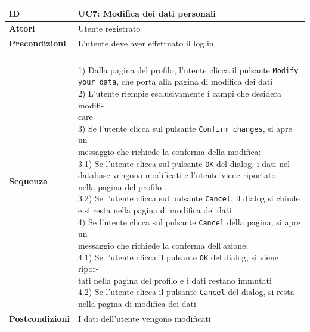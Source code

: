 \documentclass[12pt,a4paper]{article}
\begin{document}
	\begin{tabular}{|l|l|}
		\hline
		\textbf{ID} & UC7: Modifica dei dati personali\\
		\hline
		\textbf{Attori} & Utente registrato\\
		\hline
		\textbf{Precondizioni} & \makecell[l]{L'utente deve aver effettuato il log in\vspace{5px}\\}\\
		\hline
		\textbf{Sequenza} & \makecell[l]{\\1) Dalla pagina del profilo, l'utente clicca il pulsante \texttt{Modify} \\ \texttt{your data}, che porta alla pagina di modifica dei dati\vspace{5px}\\
			2) L'utente riempie esclusivamente i campi che desidera modifi-\\care\vspace{5px}\\
			3) Se l'utente clicca sul pulsante \texttt{Confirm changes}, si apre un \\messaggio che richiede la conferma della modifica:\vspace{5px}\\
			\hspace{11px} 3.1) Se l'utente clicca sul pulsante \texttt{OK} del dialog, i dati nel\\ 
			\hspace{38px}database vengono modificati e l'utente viene riportato \\
			\hspace{38px}nella pagina del profilo\vspace{5px}\\
			\hspace{11px} 3.2) Se l'utente clicca sul pulsante \texttt{Cancel}, il dialog si chiude\\
			\hspace{38px}e si resta nella pagina di modifica dei dati\vspace{5px}\\
			4) Se l'utente clicca sul pulsante \texttt{Cancel} della pagina, si apre un\\
			messaggio che richiede la conferma dell'azione:\vspace{5px}\\
			\hspace{11px} 4.1) Se l'utente clicca il pulsante \texttt{OK} del dialog, si viene ripor-\\
			\hspace{38px}tati nella pagina del profilo e i dati restano immutati\vspace{5px}\\
			\hspace{11px} 4.2) Se l'utente clicca il pulsante \texttt{Cancel} del dialog, si resta \\
			\hspace{38px} nella pagina di modifica dei dati\vspace{5px}}\\
		\hline
		\textbf{Postcondizioni} & I dati dell'utente vengono modificati\\
		\hline
	\end{tabular}
\end{document}
